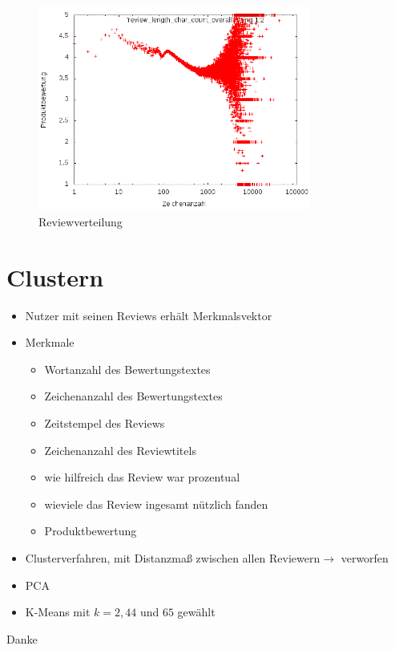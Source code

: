 \documentclass{beamer}
\begin{document}
	\begin{frame}
		\begin{figure}[H]
    \includegraphics[width=0.8\textwidth]{_results/char_rating.png}
    \caption{Reviewverteilung}
	\end{figure}
	\end{frame}
	
	\section{Clustern}
	\begin{frame}
	\begin{itemize}
	\item Nutzer mit seinen Reviews erhält Merkmalsvektor
	\item Merkmale
	\begin{itemize}
	\item Wortanzahl des Bewertungstextes
	\item Zeichenanzahl des Bewertungstextes
	\item Zeitstempel des Reviews
	\item Zeichenanzahl des Reviewtitels
	\item wie hilfreich das Review war prozentual
	\item wieviele das Review ingesamt nützlich fanden
	\item Produktbewertung
	\end{itemize}
	\item Clusterverfahren, mit Distanzmaß zwischen allen Reviewern$\rightarrow$ verworfen
	\item PCA
	\item K-Means mit $k=2,44$ und $65$ gewählt
	\end{itemize}
	\end{frame}
	
	\begin{frame}
	\centering
	{\Huge Danke}
	\end{frame}
	
	
\end{document}
